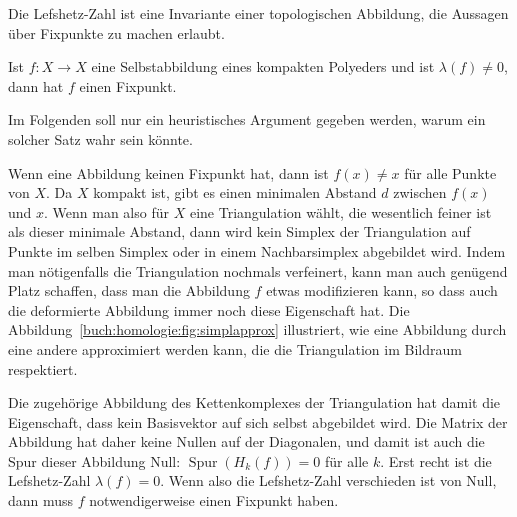 Die Lefshetz-Zahl ist eine Invariante einer topologischen Abbildung,
die Aussagen über Fixpunkte zu machen erlaubt.

\begin{satz}
Ist $f\colon X\to X$ eine Selbstabbildung eines kompakten Polyeders und
ist $\lambda(f) \ne 0$, dann hat $f$ einen Fixpunkt.
\end{satz}

Im Folgenden soll nur ein heuristisches Argument gegeben werden, warum
ein solcher Satz wahr sein könnte.


Wenn eine Abbildung keinen Fixpunkt hat, dann ist $f(x) \ne x$ für alle
Punkte von $X$.
Da $X$ kompakt ist, gibt es einen minimalen Abstand $d$ zwischen $f(x)$ und $x$.
Wenn man also für $X$ eine Triangulation wählt, die wesentlich feiner ist
als dieser minimale Abstand, dann wird kein Simplex der Triangulation auf
Punkte im selben Simplex oder in einem Nachbarsimplex abgebildet wird.
Indem man nötigenfalls die Triangulation nochmals verfeinert, kann man auch
genügend Platz schaffen, dass man die Abbildung $f$ etwas modifizieren kann,
so dass auch die deformierte Abbildung immer noch diese Eigenschaft hat.
Die Abbildung~\ref{buch:homologie:fig:simplapprox} illustriert, wie eine
Abbildung durch eine andere approximiert werden kann, die die Triangulation
im Bildraum respektiert.

Die zugehörige Abbildung des Kettenkomplexes der Triangulation hat damit
die Eigenschaft, dass kein Basisvektor auf sich selbst abgebildet wird.
Die Matrix der Abbildung hat daher keine Nullen auf der Diagonalen, und
damit ist auch die Spur dieser Abbildung Null: $\operatorname{Spur}(H_k(f))=0$
für alle $k$.
Erst recht ist die Lefshetz-Zahl $\lambda(f)=0$.
Wenn also die Lefshetz-Zahl verschieden ist von Null, dann muss $f$
notwendigerweise einen Fixpunkt haben.

